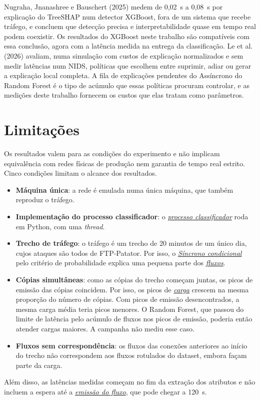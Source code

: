 \documentclass[
  12pt,
  oneside,
  a4paper,
  chapter=TITLE,
  sumario=tradicional,
  english,
  brazil
]{abntex2}
\newcommand{\termo}[2]{\hyperref[gl:#1]{\emph{#2}}}
\begin{document}
Nugraha, Jnanashree e Bauschert (2025) medem de 0,02~s a 0,08~s por explicação do TreeSHAP num
detector XGBoost, fora de um sistema que recebe tráfego, e concluem que detecção precisa e
interpretabilidade quase em tempo real podem coexistir. Os resultados do XGBoost neste trabalho são
compatíveis com essa conclusão, agora com a latência medida na entrega da classificação. Le et al.
(2026) avaliam, numa simulação com custos de explicação normalizados e sem medir latências num NIDS,
políticas que escolhem entre
suprimir, adiar ou gerar a explicação local completa. A fila de explicações pendentes do Assíncrono
do Random Forest é o tipo de acúmulo que essas políticas procuram controlar, e as medições deste
trabalho fornecem os custos que elas tratam como parâmetros.

\section{Limitações}
\label{sec:limitacoes}

Os resultados valem para as condições do experimento e não implicam equivalência com redes físicas
de produção nem garantia de tempo real estrito. Cinco condições limitam o alcance dos resultados.
\begin{itemize}
  \item \textbf{Máquina única}: a rede é emulada numa única máquina, que também reproduz o tráfego.
  \item \textbf{Implementação do processo classificador}: o
  \termo{processo-classificador}{processo classificador} roda em Python, com uma \emph{thread}.
  \item \textbf{Trecho de tráfego}: o tráfego é um trecho de 20 minutos de um único dia, cujos
  ataques são todos de FTP-Patator. Por isso, o \termo{sincrono-condicional}{Síncrono condicional}
  pelo critério de probabilidade explica uma pequena parte dos \termo{fluxo}{fluxos}.
  \item \textbf{Cópias simultâneas}: como as cópias do trecho começam juntas, os picos de emissão das
  cópias coincidem. Por isso, os picos de \termo{carga}{carga} crescem na mesma proporção do número
  de cópias. Com picos de emissão desencontrados, a mesma carga média teria picos menores. O Random
  Forest, que passou do limite de latência pelo acúmulo de fluxos nos picos de emissão, poderia então
  atender cargas maiores. A campanha não mediu esse caso.
  \item \textbf{Fluxos sem correspondência}: os fluxos das conexões anteriores ao início do trecho não
  correspondem aos fluxos rotulados do dataset, embora façam parte da carga.
\end{itemize}
Além disso, as latências medidas começam no fim da extração dos atributos e não incluem a espera até
a \termo{emissao}{emissão do fluxo}, que pode chegar a 120~s.
\end{document}
